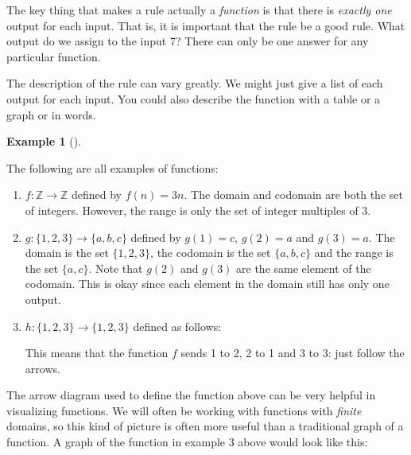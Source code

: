 \documentclass[10pt,]{memoir}
\theoremstyle{plain}
\theoremstyle{definition}
\newtheorem{example}[theorem]{Example}
\theoremstyle{definition}
\theoremstyle{definition}
\numberwithin{equation}{chapter}
\def\Z{\mathbb Z}
\begin{document}
      The key thing that makes a rule actually a \emph{function} is that there is \emph{exactly one} output for each input. That is, it is important that the rule be a good rule. What output do we assign to the input 7? There can only be one answer for any particular function.
\par

      The description of the rule can vary greatly. We might just give a list of each output for each input. You could also describe the function with a table or a graph or in words.
\begin{example}[]\label{example-16}

          The following are all examples of functions:
\leavevmode%
\begin{enumerate}
\item\hypertarget{li-276}{}\(f:\Z \to \Z\) defined by \(f(n) = 3n\). The domain and codomain are both the set of integers. However, the range is only the set of integer multiples of 3.\item\hypertarget{li-277}{}\(g: \{1,2,3\} \to \{a,b,c\}\) defined by \(g(1) = c\), \(g(2) = a\) and \(g(3) = a\). The domain is the set \(\{1,2,3\}\), the codomain is the set \(\{a,b,c\}\) and the range is the set \(\{a,c\}\). Note that \(g(2)\) and \(g(3)\) are the same element of the codomain. This is okay since each element in the domain still has only one output.\item\hypertarget{li-278}{}\(h:\{1,2,3\} \to \{1,2,3\}\) defined as follows:

            \leavevmode%
\begin{figure}
\centering
{
}
\end{figure}

            This means that the function \(f\) sends 1 to 2, 2 to 1 and 3 to 3: just follow the arrows.
          \end{enumerate}
\end{example}
\par

      The arrow diagram used to define the function above can be very helpful in visualizing functions. We will often be working with functions with \emph{finite} domains, so this kind of picture is often more useful than a traditional graph of a function. A graph of the function in example 3 above would look like this:
\leavevmode%
\begin{figure}
\centering
{
}
\end{figure}
\par
\end{document}
